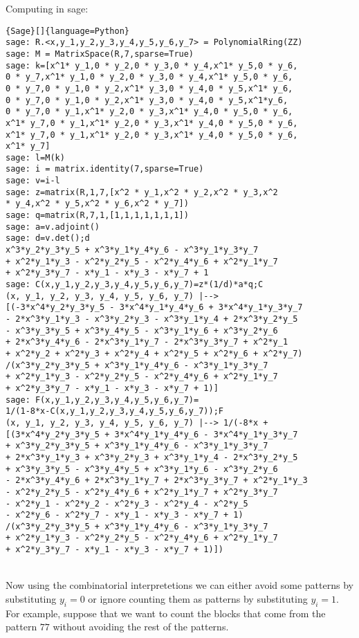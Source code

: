 \documentclass[12pt]{report}
\begin{document}
{{\noindent Computing in sage:
{
\begin{lstlisting}{Sage}[]{language=Python}
sage: R.<x,y_1,y_2,y_3,y_4,y_5,y_6,y_7> = PolynomialRing(ZZ)
sage: M = MatrixSpace(R,7,sparse=True)
sage: k=[x^1* y_1,0 * y_2,0 * y_3,0 * y_4,x^1* y_5,0 * y_6,
0 * y_7,x^1* y_1,0 * y_2,0 * y_3,0 * y_4,x^1* y_5,0 * y_6,
0 * y_7,0 * y_1,0 * y_2,x^1* y_3,0 * y_4,0 * y_5,x^1* y_6,
0 * y_7,0 * y_1,0 * y_2,x^1* y_3,0 * y_4,0 * y_5,x^1*y_6,
0 * y_7,0 * y_1,x^1* y_2,0 * y_3,x^1* y_4,0 * y_5,0 * y_6,
x^1* y_7,0 * y_1,x^1* y_2,0 * y_3,x^1* y_4,0 * y_5,0 * y_6,
x^1* y_7,0 * y_1,x^1* y_2,0 * y_3,x^1* y_4,0 * y_5,0 * y_6,
x^1* y_7]
sage: l=M(k)
sage: i = matrix.identity(7,sparse=True)
sage: v=i-l
sage: z=matrix(R,1,7,[x^2 * y_1,x^2 * y_2,x^2 * y_3,x^2 
* y_4,x^2 * y_5,x^2 * y_6,x^2 * y_7])
sage: q=matrix(R,7,1,[1,1,1,1,1,1,1])
sage: a=v.adjoint()
sage: d=v.det();d
x^3*y_2*y_3*y_5 + x^3*y_1*y_4*y_6 - x^3*y_1*y_3*y_7 
+ x^2*y_1*y_3 - x^2*y_2*y_5 - x^2*y_4*y_6 + x^2*y_1*y_7 
+ x^2*y_3*y_7 - x*y_1 - x*y_3 - x*y_7 + 1
sage: C(x,y_1,y_2,y_3,y_4,y_5,y_6,y_7)=z*(1/d)*a*q;C
(x, y_1, y_2, y_3, y_4, y_5, y_6, y_7) |--> 
[(-3*x^4*y_2*y_3*y_5 - 3*x^4*y_1*y_4*y_6 + 3*x^4*y_1*y_3*y_7 
- 2*x^3*y_1*y_3 - x^3*y_2*y_3 - x^3*y_1*y_4 + 2*x^3*y_2*y_5 
- x^3*y_3*y_5 + x^3*y_4*y_5 - x^3*y_1*y_6 + x^3*y_2*y_6 
+ 2*x^3*y_4*y_6 - 2*x^3*y_1*y_7 - 2*x^3*y_3*y_7 + x^2*y_1 
+ x^2*y_2 + x^2*y_3 + x^2*y_4 + x^2*y_5 + x^2*y_6 + x^2*y_7)
/(x^3*y_2*y_3*y_5 + x^3*y_1*y_4*y_6 - x^3*y_1*y_3*y_7 
+ x^2*y_1*y_3 - x^2*y_2*y_5 - x^2*y_4*y_6 + x^2*y_1*y_7 
+ x^2*y_3*y_7 - x*y_1 - x*y_3 - x*y_7 + 1)]
sage: F(x,y_1,y_2,y_3,y_4,y_5,y_6,y_7)=
1/(1-8*x-C(x,y_1,y_2,y_3,y_4,y_5,y_6,y_7));F
(x, y_1, y_2, y_3, y_4, y_5, y_6, y_7) |--> 1/(-8*x + 
[(3*x^4*y_2*y_3*y_5 + 3*x^4*y_1*y_4*y_6 - 3*x^4*y_1*y_3*y_7 
+ x^3*y_2*y_3*y_5 + x^3*y_1*y_4*y_6 - x^3*y_1*y_3*y_7 
+ 2*x^3*y_1*y_3 + x^3*y_2*y_3 + x^3*y_1*y_4 - 2*x^3*y_2*y_5 
+ x^3*y_3*y_5 - x^3*y_4*y_5 + x^3*y_1*y_6 - x^3*y_2*y_6 
- 2*x^3*y_4*y_6 + 2*x^3*y_1*y_7 + 2*x^3*y_3*y_7 + x^2*y_1*y_3 
- x^2*y_2*y_5 - x^2*y_4*y_6 + x^2*y_1*y_7 + x^2*y_3*y_7 
- x^2*y_1 - x^2*y_2 - x^2*y_3 - x^2*y_4 - x^2*y_5 
- x^2*y_6 - x^2*y_7 - x*y_1 - x*y_3 - x*y_7 + 1)
/(x^3*y_2*y_3*y_5 + x^3*y_1*y_4*y_6 - x^3*y_1*y_3*y_7 
+ x^2*y_1*y_3 - x^2*y_2*y_5 - x^2*y_4*y_6 + x^2*y_1*y_7 
+ x^2*y_3*y_7 - x*y_1 - x*y_3 - x*y_7 + 1)])
\end{lstlisting}} \quad \\

\noindent Now using the combinatorial interpretetions we can either avoid some patterns by substituting $y_i=0$ or ignore counting them as patterns by substituting $y_i=1$. For example, suppose that we want to count the blocks that come from the pattern $77$ without avoiding the rest of the patterns.

}}
\end{document}
